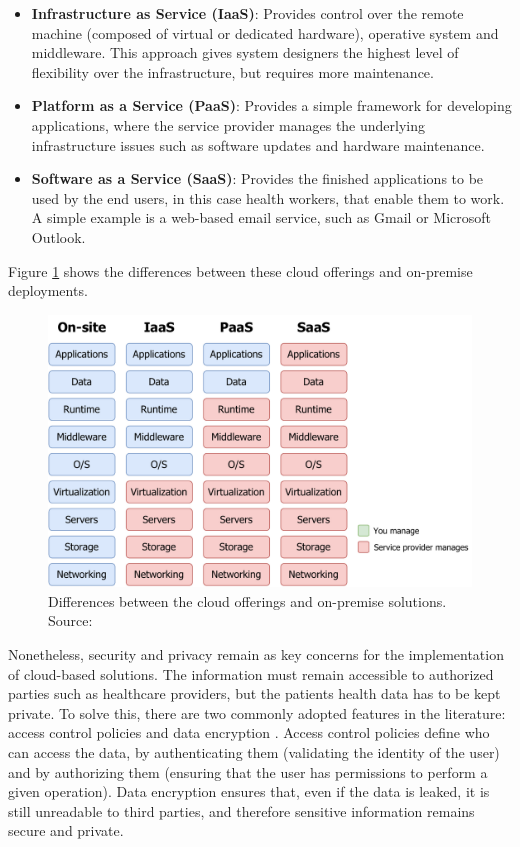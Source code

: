 \begin{itemize}
    \item \textbf{Infrastructure as Service (IaaS)}: Provides control over the remote machine (composed of virtual or dedicated hardware), operative system and middleware. This approach gives system designers the highest level of flexibility over the infrastructure, but requires more maintenance.
    \item \textbf{Platform as a Service (PaaS)}: Provides a simple framework for developing applications, where the service provider manages the underlying infrastructure issues such as software updates and hardware maintenance. 
    \item \textbf{Software as a Service (SaaS)}: Provides the finished applications to be used by the end users, in this case health workers, that enable them to work. A simple example is a web-based email service, such as Gmail or Microsoft Outlook. 
\end{itemize}
Figure \ref{fig:differences-between-cloud-services} shows the differences between these cloud offerings and on-premise deployments.

\begin{figure}[H]
    \centering
    \includegraphics[width=0.7\linewidth]{images/cloud-services.pdf}
    \caption[Differences between the cloud offerings and on-premise solutions.]{ Differences between the cloud offerings and on-premise solutions. Source: \cite{RedHat2021}}
    \label{fig:differences-between-cloud-services}
\end{figure}


Nonetheless, security and privacy remain as key concerns for the implementation of cloud-based solutions. The information must remain accessible to authorized parties such as healthcare providers, but the patients health data has to be kept private. To solve this, there are two commonly adopted features in the literature: access control policies and data encryption \cite{Baker2017}. Access control policies define who can access the data, by authenticating them (validating the identity of the user) and by authorizing them (ensuring that the user has permissions to perform a given operation). Data encryption ensures that, even if the data is leaked, it is still unreadable to third parties, and therefore sensitive information remains secure and private. \bigskip

